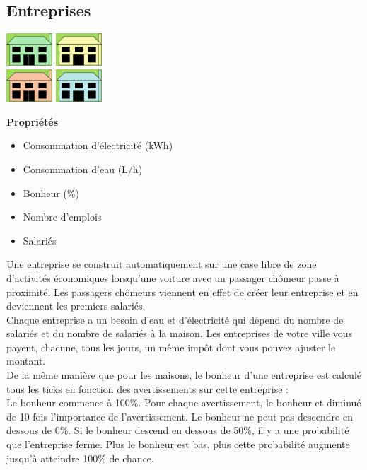 \documentclass[11pt]{report}
\begin{document}
\subsection{Entreprises}
\begin{center}
	\begin{minipage}{0.35\textwidth}
		\begin{flushright}
			\includegraphics[width=65px]{business_green}
			\includegraphics[width=65px]{business_yellow}\\
			\includegraphics[width=65px]{business_beige}
			\includegraphics[width=65px]{business_blue}
		\end{flushright}
	\end{minipage}
	\begin{minipage}{0.6\textwidth}
		\textbf{Propriétés}
		\begin{itemize}
			\item Consommation d'électricité (kWh)
			\item Consommation d'eau (L/h)
			\item Bonheur (\%)
			\item Nombre d'emplois
			\item Salariés
		\end{itemize}
	\end{minipage}
\end{center}

Une entreprise se construit automatiquement sur une case libre de zone d'activités économiques lorsqu'une voiture avec un passager chômeur passe à proximité. Les passagers chômeurs viennent en effet de créer leur entreprise et en deviennent les premiers salariés.\\
Chaque entreprise a un besoin d'eau et d'électricité qui dépend du nombre de salariés et du nombre de salariés à la maison.
Les entreprises de votre ville vous payent, chacune, tous les jours, un même impôt dont vous pouvez ajuster le montant.\\
De la même manière que pour les maisons, le bonheur d'une entreprise est calculé tous les ticks en fonction des avertissements sur cette entreprise :\\
Le bonheur commence à 100\%. Pour chaque avertissement, le bonheur et diminué de 10 fois l'importance de l'avertissement. Le bonheur ne peut pas descendre en dessous de 0\%.
Si le bonheur descend en dessous de 50\%, il y a une probabilité que l'entreprise ferme. Plus le bonheur est bas, plus cette probabilité augmente jusqu'à atteindre 100\% de chance.
\end{document}
